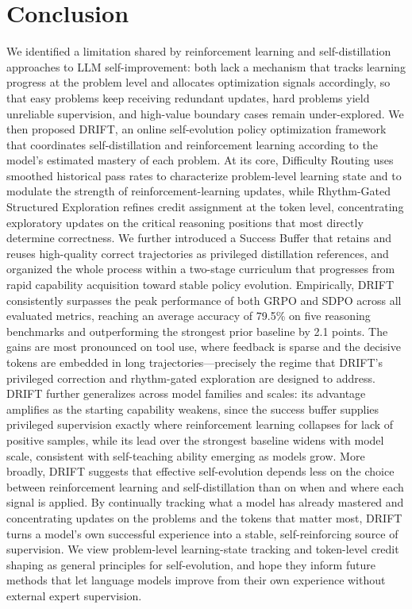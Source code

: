 \documentclass{article}
\begin{document}
\section{Conclusion}
We identified a limitation shared by reinforcement learning and self-distillation approaches to LLM self-improvement: both lack a mechanism that tracks learning progress at the problem level and allocates optimization signals accordingly, so that easy problems keep receiving redundant updates, hard problems yield unreliable supervision, and high-value boundary cases remain under-explored. We then proposed DRIFT, an online self-evolution policy optimization framework that coordinates self-distillation and reinforcement learning according to the model's estimated mastery of each problem. At its core, Difficulty Routing uses smoothed historical pass rates to characterize problem-level learning state and to modulate the strength of reinforcement-learning updates, while Rhythm-Gated Structured Exploration refines credit assignment at the token level, concentrating exploratory updates on the critical reasoning positions that most directly determine correctness. We further introduced a Success Buffer that retains and reuses high-quality correct trajectories as privileged distillation references, and organized the whole process within a two-stage curriculum that progresses from rapid capability acquisition toward stable policy evolution.
Empirically, DRIFT consistently surpasses the peak performance of both GRPO and SDPO across all evaluated metrics, reaching an average accuracy of 79.5\% on five reasoning benchmarks and outperforming the strongest prior baseline by 2.1 points. The gains are most pronounced on tool use, where feedback is sparse and the decisive tokens are embedded in long trajectories—precisely the regime that DRIFT's privileged correction and rhythm-gated exploration are designed to address. DRIFT further generalizes across model families and scales: its advantage amplifies as the starting capability weakens, since the success buffer supplies privileged supervision exactly where reinforcement learning collapses for lack of positive samples, while its lead over the strongest baseline widens with model scale, consistent with self-teaching ability emerging as models grow.
More broadly, DRIFT suggests that effective self-evolution depends less on the choice between reinforcement learning and self-distillation than on when and where each signal is applied. By continually tracking what a model has already mastered and concentrating updates on the problems and the tokens that matter most, DRIFT turns a model's own successful experience into a stable, self-reinforcing source of supervision. We view problem-level learning-state tracking and token-level credit shaping as general principles for self-evolution, and hope they inform future methods that let language models improve from their own experience without external expert supervision.
\end{document}
